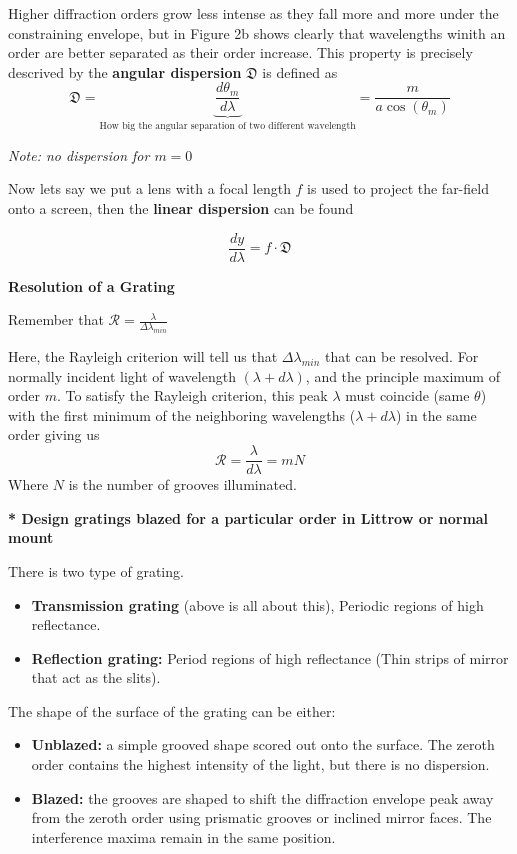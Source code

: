 \documentclass[10pt]{article}
\newcommand*{\lo}[1]{
    \textbf{* #1} \newline
}
\begin{document}
Higher diffraction orders grow less intense as they fall more and more under the constraining envelope, but in Figure 2b shows clearly that wavelengths winith an order are better separated as their order increase. This property is precisely descrived by the \textbf{angular dispersion} $\mathfrak{D}$ is defined as
\[\mathfrak{D} = \underbrace{\frac{d\theta_m}{d\lambda}}_{\text{How big the angular separation of two different wavelength}} = \frac{m}{a\cos(\theta_m)}\]

\textit{Note: no dispersion for $m= 0$ }

\newpage

Now lets say we put a lens with a focal length $f$ is used to project the far-field onto a screen, then the \textbf{linear dispersion} can be found

\[\frac{dy}{d\lambda} = f \cdot \mathfrak{D}\]

\textbf{Resolution of a Grating}

Remember that $\mathcal{R} = \frac{\lambda}{\Delta \lambda_{min}}$

\newblock

Here, the Rayleigh criterion will tell us that $\Delta \lambda_{min}$ that can be resolved. For normally incident light of wavelength $(\lambda + d\lambda)$, and the principle maximum of order $m$. To satisfy the Rayleigh criterion, this peak $\lambda$ must coincide (same $\theta$) with the first minimum of the neighboring wavelengths ($\lambda + d \lambda$) in the same order giving us
\[\mathcal{R} = \frac{\lambda}{d\lambda} = mN\]
Where $N$ is the number of grooves illuminated.


\lo{Design gratings blazed for a particular order in Littrow or normal mount}

There is two type of grating. 

\begin{itemize}
    \item \textbf{Transmission grating} (above is all about this), Periodic regions of high reflectance. 
    \item \textbf{Reflection grating:} Period regions of high reflectance (Thin strips of mirror that act as the slits).
\end{itemize}

The shape of the surface of the grating can be either:

\begin{itemize}
    \item \textbf{Unblazed:} a simple grooved shape scored out onto the surface. The zeroth order contains the highest intensity of the light, but there is no dispersion.
    \item \textbf{Blazed:} the grooves are shaped to shift the diffraction envelope peak away from the zeroth order using prismatic grooves or inclined mirror faces. The interference maxima remain in the same position.
\end{itemize}
\end{document}
